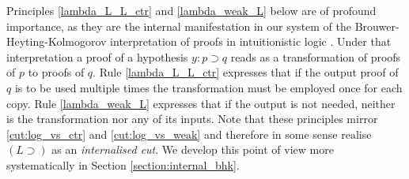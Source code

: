 \documentclass[english,letter paper,12pt,leqno]{article}
\theoremstyle{example}
\numberwithin{equation}{section}
\def\imp{\supset}
\begin{document}
Principles \eqref{lambda_L_L_ctr} and \eqref{lambda_weak_L} below are of profound importance, as they are the internal manifestation in our system of the Brouwer-Heyting-Kolmogorov interpretation of proofs in intuitionistic logic \cite{troelstra}. Under that interpretation a proof of a hypothesis $y: p \imp q$ reads as a transformation of proofs of $p$ to proofs of $q$. Rule \eqref{lambda_L_L_ctr} expresses that if the output proof of $q$ is to be used multiple times the transformation must be employed once for each copy. Rule \eqref{lambda_weak_L} expresses that if the output is not needed, neither is the transformation nor any of its inputs. Note that these principles mirror \eqref{cut:log_vs_ctr} and \eqref{cut:log_vs_weak} and therefore in some sense realise $(L \imp)$ as an \emph{internalised cut}. We develop this point of view more systematically in Section \ref{section:internal_bhk}.
\end{document}

